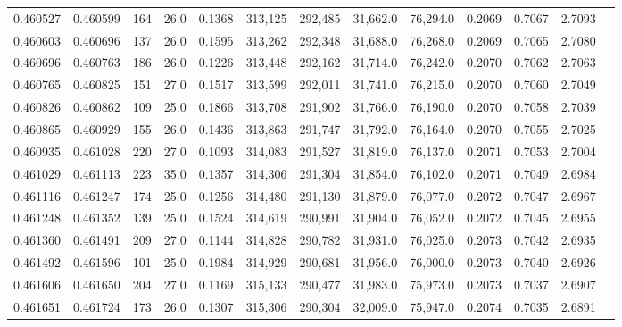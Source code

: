 \begin{tabular}{rrrrrrrrrrrrr}
0.460527 & 0.460599 &   164 & 26.0 &                                     0.1368 & 313,125 & 292,485 &  31,662.0 &  76,294.0 & 0.2069 & 0.7067 & 2.7093 \\
0.460603 & 0.460696 &   137 & 26.0 &                                     0.1595 & 313,262 & 292,348 &  31,688.0 &  76,268.0 & 0.2069 & 0.7065 & 2.7080 \\
0.460696 & 0.460763 &   186 & 26.0 &                                     0.1226 & 313,448 & 292,162 &  31,714.0 &  76,242.0 & 0.2070 & 0.7062 & 2.7063 \\
0.460765 & 0.460825 &   151 & 27.0 &                                     0.1517 & 313,599 & 292,011 &  31,741.0 &  76,215.0 & 0.2070 & 0.7060 & 2.7049 \\
0.460826 & 0.460862 &   109 & 25.0 &                                     0.1866 & 313,708 & 291,902 &  31,766.0 &  76,190.0 & 0.2070 & 0.7058 & 2.7039 \\
0.460865 & 0.460929 &   155 & 26.0 &                                     0.1436 & 313,863 & 291,747 &  31,792.0 &  76,164.0 & 0.2070 & 0.7055 & 2.7025 \\
0.460935 & 0.461028 &   220 & 27.0 &                                     0.1093 & 314,083 & 291,527 &  31,819.0 &  76,137.0 & 0.2071 & 0.7053 & 2.7004 \\
0.461029 & 0.461113 &   223 & 35.0 &                                     0.1357 & 314,306 & 291,304 &  31,854.0 &  76,102.0 & 0.2071 & 0.7049 & 2.6984 \\
0.461116 & 0.461247 &   174 & 25.0 &                                     0.1256 & 314,480 & 291,130 &  31,879.0 &  76,077.0 & 0.2072 & 0.7047 & 2.6967 \\
0.461248 & 0.461352 &   139 & 25.0 &                                     0.1524 & 314,619 & 290,991 &  31,904.0 &  76,052.0 & 0.2072 & 0.7045 & 2.6955 \\
0.461360 & 0.461491 &   209 & 27.0 &                                     0.1144 & 314,828 & 290,782 &  31,931.0 &  76,025.0 & 0.2073 & 0.7042 & 2.6935 \\
0.461492 & 0.461596 &   101 & 25.0 &                                     0.1984 & 314,929 & 290,681 &  31,956.0 &  76,000.0 & 0.2073 & 0.7040 & 2.6926 \\
0.461606 & 0.461650 &   204 & 27.0 &                                     0.1169 & 315,133 & 290,477 &  31,983.0 &  75,973.0 & 0.2073 & 0.7037 & 2.6907 \\
0.461651 & 0.461724 &   173 & 26.0 &                                     0.1307 & 315,306 & 290,304 &  32,009.0 &  75,947.0 & 0.2074 & 0.7035 & 2.6891 \\

\end{tabular}
